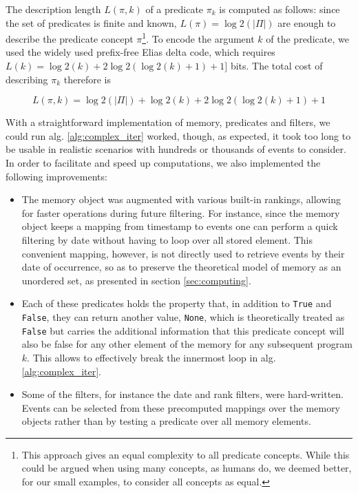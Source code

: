 \documentclass[entropy,article,submit,moreauthors,pdftex]{Definitions/mdpi}
\begin{document}
The description length $L(\pi, k)$ of a predicate $\pi_k$ is computed as follows: since the set of predicates is finite and known, $L(\pi) = \log2(|\Pi|)$ are enough to describe the predicate concept $\pi$\footnote{This approach gives an equal complexity to all predicate concepts. While this could be argued when using many concepts, as humans do, we deemed better, for our small examples, to consider all concepts as equal.}. To encode the argument $k$ of the predicate, we used the widely used prefix-free Elias delta code\cite{elias_universal_1975}, which requires $L(k) = \log2(k) + 2 \log2(\log2(k)+1) + 1]$ bits. The total cost of describing $\pi_{k}$ therefore is

\begin{equation}
    \label{eq:pred_cost}
    L(\pi, k) = \log2(|\Pi|) + \log2(k) + 2 \log2(\log2(k) + 1) + 1
\end{equation}

With a straightforward implementation of memory, predicates and filters, we could run alg. \ref{alg:complex_iter} worked, though, as expected, it took too
long to be usable in realistic scenarios with hundreds or thousands of events to
consider. In order to facilitate and speed up computations, we also implemented
the following improvements:
\begin{itemize}
    \item The memory object was augmented with various built-in rankings, allowing
          for faster operations during future filtering. For instance, since the memory
          object keeps a mapping from timestamp to events one can perform a quick
          filtering by date without having to loop over all stored element. This convenient mapping,
          however, is not directly used to retrieve events by their date of occurrence, so as to
          preserve the theoretical model of memory as an unordered set, as presented in
          section \ref{sec:computing}.

    \item Each of these predicates holds the property that, in addition to
          \texttt{True} and \texttt{False}, they can return another value,
          \texttt{None}, which is theoretically treated as \texttt{False} but carries
          the additional information that this predicate concept will also be false for
          any other element of the memory for any subsequent program $k$. This allows to
          effectively break the innermost loop in alg. \ref{alg:complex_iter}.

    \item Some of the filters, for instance the date and rank filters, were
          hard-written. Events can be selected from these precomputed mappings over the memory objects
          rather than by testing a predicate over all memory elements.
\end{itemize}
\end{document}
